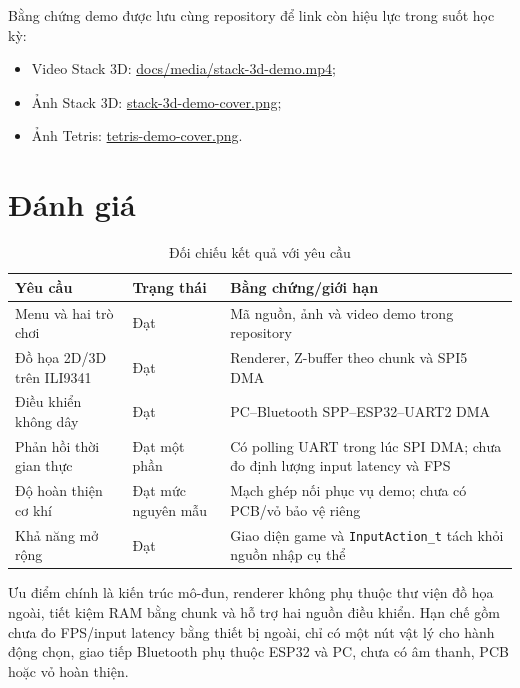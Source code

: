 Bằng chứng demo được lưu cùng repository để link còn hiệu lực trong suốt học kỳ:
\begin{itemize}
  \item Video Stack 3D: \href{https://github.com/nqd2/stm32-simple-gameboy/blob/main/docs/media/stack-3d-demo.mp4}{docs/media/stack-3d-demo.mp4};
  \item Ảnh Stack 3D: \href{https://github.com/nqd2/stm32-simple-gameboy/blob/main/docs/media/stack-3d-demo-cover.png}{stack-3d-demo-cover.png};
  \item Ảnh Tetris: \href{https://github.com/nqd2/stm32-simple-gameboy/blob/main/docs/media/tetris-demo-cover.png}{tetris-demo-cover.png}.
\end{itemize}

\section{Đánh giá}

\begin{table}[H]
\centering
\small
\caption{Đối chiếu kết quả với yêu cầu}
\label{tab:evaluation}
\begin{tabularx}{\textwidth}{@{}L{0.26\textwidth}C{0.16\textwidth}Y@{}}
\toprule
\textbf{Yêu cầu} & \textbf{Trạng thái} & \textbf{Bằng chứng/giới hạn} \\
\midrule
Menu và hai trò chơi & Đạt & Mã nguồn, ảnh và video demo trong repository \\
Đồ họa 2D/3D trên ILI9341 & Đạt & Renderer, Z-buffer theo chunk và SPI5 DMA \\
Điều khiển không dây & Đạt & PC--Bluetooth SPP--ESP32--UART2 DMA \\
Phản hồi thời gian thực & Đạt một phần & Có polling UART trong lúc SPI DMA; chưa đo định lượng input latency và FPS \\
Độ hoàn thiện cơ khí & Đạt mức nguyên mẫu & Mạch ghép nối phục vụ demo; chưa có PCB/vỏ bảo vệ riêng \\
Khả năng mở rộng & Đạt & Giao diện game và \texttt{InputAction\_t} tách khỏi nguồn nhập cụ thể \\
\bottomrule
\end{tabularx}
\end{table}

Ưu điểm chính là kiến trúc mô-đun, renderer không phụ thuộc thư viện đồ họa ngoài, tiết kiệm RAM bằng chunk và hỗ trợ hai nguồn điều khiển. Hạn chế gồm chưa đo FPS/input latency bằng thiết bị ngoài, chỉ có một nút vật lý cho hành động chọn, giao tiếp Bluetooth phụ thuộc ESP32 và PC, chưa có âm thanh, PCB hoặc vỏ hoàn thiện.

